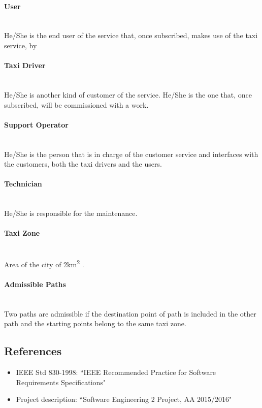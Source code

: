 \paragraph{User} \hfill \\
\label{def:user} He/She is the end user of the service that, once subscribed, makes use of the taxi service, by 

\paragraph{Taxi Driver} \hfill \\
\label{def:taxidriver} He/She is another kind of customer of the service. He/She is the one that, once subscribed, will be commissioned with a work.

\paragraph{Support Operator} \hfill \\
\label{def:operator} He/She is the person that is in charge of the customer service and interfaces with the customers, both the taxi drivers and the users.

\paragraph{Technician} \hfill \\
\label{def:technician} He/She is responsible for the maintenance.

\paragraph{Taxi Zone} \hfill \\
\label{def:taxi_zone} Area of the city of 2km\textsuperscript{2} .

\paragraph{Admissible Paths} \hfill \\
\label{def:admissible} Two paths are admissible if the destination point of path is included in the other path and the starting points belong to the same taxi zone.


\subsection{References}
\begin{itemize}
\item IEEE Std 830-1998: ``IEEE Recommended Practice for Software Requirements Specifications"
\item Project description: ``Software Engineering 2 Project, AA 2015/2016"
\end{itemize}

